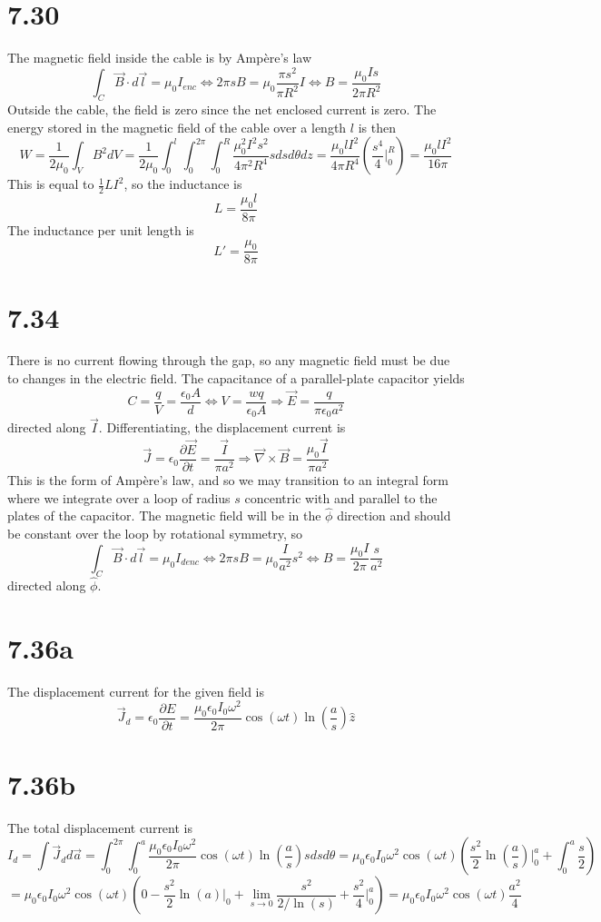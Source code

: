 \documentclass{article}
\begin{document}
\section*{7.30}
The magnetic field inside the cable is by Amp\`ere's law
\[\int_C\vec{B}\cdot
  d\vec{l}=\mu_0I_{enc}\Leftrightarrow 2\pi sB=\mu_0\frac{\pi s^2}{\pi R^2}I\Leftrightarrow B=\frac{\mu_0Is}{2\pi R^2}\]
Outside the cable, the field is zero since the net enclosed current is zero.
The energy stored in the magnetic field of the cable over a length $l$ is then
\[W=\frac{1}{2\mu_0}\int_VB^2dV=\frac{1}{2\mu_0}\int_0^l\int_0^{2\pi}\int_0^R\frac{\mu_0^2I^2s^2}{4\pi^2 R^4} sdsd\theta dz=\frac{\mu_0lI^2}{4\pi R^4}\left( \frac{s^4}{4}\bigg|_0^R \right)=\frac{\mu_0lI^2}{16\pi}\]
This is equal to $\frac{1}{2}LI^2$, so the inductance is
\[L=\frac{\mu_0l}{8\pi}\]
The inductance per unit length is
\[L'=\frac{\mu_0}{8\pi}\]
\section*{7.34}
There is no current flowing through the gap, so any magnetic field must be due to changes in the electric field. The capacitance of a parallel-plate capacitor yields
\[C=\frac{q}{V}=\frac{\epsilon_0 A}{d}\Leftrightarrow V=\frac{wq}{\epsilon_0A}\Rightarrow \vec{E}=\frac{q}{\pi\epsilon_0a^2}\]
directed along $\vec{I}$. Differentiating, the displacement current is
\[\vec{J}=\epsilon_0\frac{\partial \vec{E}}{\partial t}=\frac{\vec{I}}{\pi a^2}\Rightarrow \vec{\nabla}\times \vec{B}=\frac{\mu_0\vec{I}}{\pi a^2}\]
This is the form of Amp\`ere's law, and so we may transition to an integral form where we integrate over a loop of radius $s$ concentric with and parallel to the plates of the capacitor. The magnetic field will be in the $\hat{\phi}$ direction and should be constant over the loop by rotational symmetry, so
\[\int_C\vec{B}\cdot d\vec{l}=\mu_0I_{denc}\Leftrightarrow 2\pi sB=\mu_0\frac{I}{a^2}s^2 \Leftrightarrow B=\frac{\mu_0I}{2\pi}\frac{s}{a^2}\]
directed along $\hat{\phi}$.

\section*{7.36a}
The displacement current for the given field is
\[\vec{J}_d=\epsilon_0\frac{\partial E}{\partial t}=\frac{\mu_0\epsilon_0I_0\omega^2}{2\pi}\cos(\omega t)\ln\left( \frac{a}{s} \right)\hat{z}\]

\section*{7.36b}
The total displacement current is
\[I_d=\int\vec{J}_dd\vec{a}=\int_0^{2\pi}\int_0^a\frac{\mu_0\epsilon_0I_0\omega^2}{2\pi}\cos(\omega t)\ln\left( \frac{a}{s} \right)sdsd\theta=\mu_0\epsilon_0I_0\omega^2\cos(\omega t)\left( \frac{s^2}{2}\ln\left( \frac{a}{s} \right)\bigg|_0^a+\int_0^a\frac{s}{2} \right)\]
\[=\mu_0\epsilon_0I_0\omega^2\cos(\omega t)\left( 0-\frac{s^2}{2}\ln(a)\bigg|_0+\lim_{s\to 0}\frac{s^2}{2/\ln(s)}+\frac{s^2}{4}\bigg|_0^a\right) =\mu_0\epsilon_0I_0\omega^2\cos(\omega t)\frac{a^2}{4}\]
\end{document}
